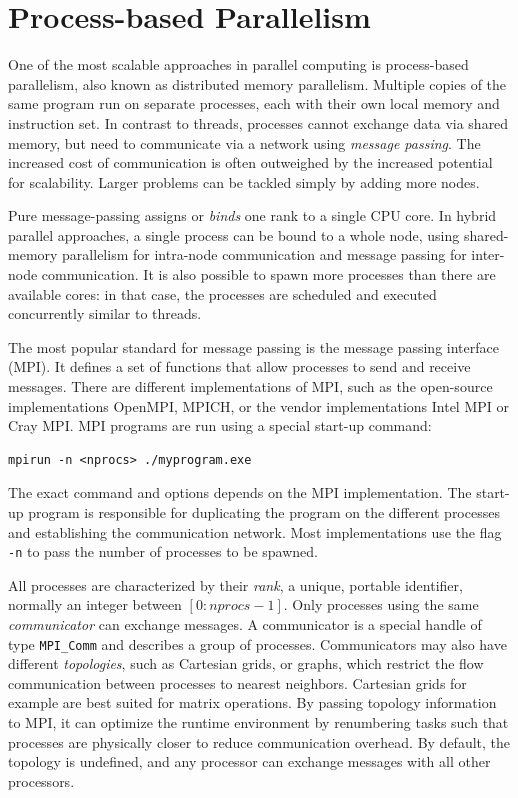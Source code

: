 \section{Process-based Parallelism}

One of the most scalable approaches in parallel computing is process-based parallelism, also known as distributed memory parallelism. Multiple copies of the same program run on separate processes, each with their own local memory and instruction set. In contrast to threads, processes cannot exchange data via shared memory, but need to communicate via a network using \emph{message passing}. The increased cost of communication is often outweighed by the increased potential for scalability. Larger problems can be tackled simply by adding more nodes. 

Pure message-passing assigns or \emph{binds} one rank to a single CPU core. In hybrid parallel approaches, a single process can be bound to a whole node, using shared-memory parallelism for intra-node communication and message passing for inter-node communication. It is also possible to spawn more processes than there are available cores: in that case, the processes are scheduled and executed concurrently similar to threads.

The most popular standard for message passing is the message passing interface (MPI). It defines a set of functions that allow processes to send and receive messages. There are different implementations of MPI, such as the open-source implementations OpenMPI, MPICH, or the vendor implementations Intel MPI or Cray MPI. MPI programs are run using a special start-up command:
\begin{lstlisting}[backgroundcolor=\color{light-gray},breaklines=true]
mpirun -n <nprocs> ./myprogram.exe 
\end{lstlisting}
\noindent The exact command and options depends on the MPI implementation. The start-up program is responsible for duplicating the program on the different processes and establishing the communication network. Most implementations use the flag \texttt{-n} to pass the number of processes to be spawned. 

All processes are characterized by their \emph{rank}, a unique, portable identifier, normally an integer between $[0:nprocs-1]$. Only processes using the same \emph{communicator} can exchange messages. A communicator is a special handle of type \texttt{MPI{\_}Comm} and describes a group of processes. Communicators may also have different \emph{topologies}, such as Cartesian grids, or  graphs, which restrict the flow communication between processes to nearest neighbors. Cartesian grids for example are best suited for matrix operations. By passing topology information to MPI, it can optimize the runtime environment by renumbering tasks such that processes are physically closer to reduce communication overhead. By default, the topology is undefined, and any processor can exchange messages with all other processors.

